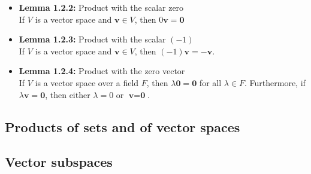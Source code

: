 \documentclass[11pt,a4paper]{article}
\begin{document}
\begin{itemize}
    \item \textbf{Lemma 1.2.2:} Product with the scalar zero \\
        If $V$ is a vector space and $\textbf{v} \in V$, then $0\textbf{v} = \textbf{0}$

    \item \textbf{Lemma 1.2.3:} Product with the scalar $(-1)$ \\
        If $V$ is a vector space and $\textbf{v} \in V$, then $(-1)\textbf{v} = -\textbf{v}$.

    \item \textbf{Lemma 1.2.4:} Product with the zero vector \\
        If $V$ is a vector space over a field $F$, then $\lambda\textbf{0} = \textbf{0}$
        for all $\lambda \in F$.
        Furthermore, if $\lambda \textbf{v} = \textbf{0}$,
        then either $\lambda = 0$ or $\textbf{v} = \textbf{0}$.
\end{itemize}

\subsection{Products of sets and of vector spaces}

\subsection{Vector subspaces}
\end{document}
